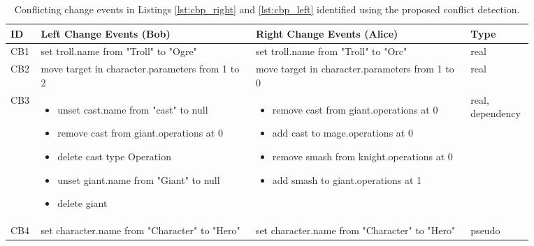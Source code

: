 \begin{table*}[ht]
  \centering
  \caption{Conflicting change events in Listings \ref{lst:cbp_right} and \ref{lst:cbp_left} identified using the proposed conflict detection.}
  \label{table:conflicts_cbp}
  \begin{scriptsize}
    \begin{tabular}{|p{0.04\linewidth}|p{0.38\linewidth}|p{0.38\linewidth}|
        p{0.07\linewidth}|}
      \hline
      \textbf{ID} & 
      \textbf{Left Change Events (Bob)} & 
      \textbf{Right Change Events (Alice)} & 
      \textbf{Type}\\ 
      \hline
      CB1 & 
      set troll.name from "Troll" to "Ogre" & 
      set troll.name from "Troll" to "Orc" & 
      real \\
      \hline
      CB2 & move target in character.parameters from 1 to 2 & 
      move target in character.parameters from 1 to 0 & 
      real \\ 
      \hline
      CB3 & 
      \begin{minipage}[t]{\linewidth}
        \raggedright
        \begin{itemize}[leftmargin=0pt]
          \setlength
          \item[] unset cast.name from "cast" to null
          \item[] remove cast from giant.operations at 0
          \item[] delete cast type Operation
          \item[] unset giant.name from "Giant" to null
          \item[] delete giant
        \end{itemize}
      \end{minipage}
      & 
      \begin{minipage}[t]{\linewidth}
        \raggedright
        \begin{itemize}[leftmargin=0pt]
          \setlength
          \item[] remove cast from giant.operations at 0
          \item[] add cast to mage.operations at 0
          \item[] remove smash from knight.operations at 0
          \item[] add smash to giant.operations at 1
        \end{itemize}
      \end{minipage}
      & 
      real, dependency\\ 
      \hline
      CB4 & 
      set character.name from "Character" to "Hero" & 
      set character.name from "Character" to "Hero" & 
      pseudo\\ 
      \hline
    \end{tabular}
  \end{scriptsize}
\end{table*}

